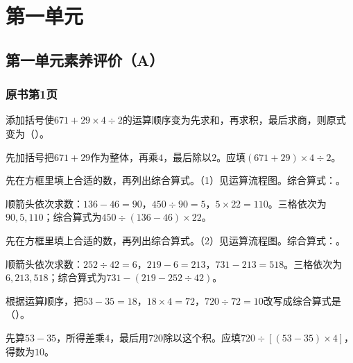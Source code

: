 \chapter{第一单元}


\section{第一单元素养评价（A）}



\subsection*{原书第1页}

添加括号使\(671+29\times4\div2\)的运算顺序变为先求和，再求积，最后求商，则原式变为（\hspace{1.8em}）。\par
\begin{BookAnswer}
先加括号把\(671+29\)作为整体，再乘\(4\)，最后除以\(2\)。应填\((671+29)\times4\div2\)。
\end{BookAnswer}

先在方框里填上合适的数，再列出综合算式。（1）见运算流程图。综合算式：\BookBlank{}。\par
{}
\begin{BookAnswer}
顺箭头依次求数：\(136-46=90\)，\allowbreak{}\(450\div90=5\)，\allowbreak{}\(5\times22=110\)。三格依次为\(90,5,110\)；综合算式为\(450\div(136-46)\times22\)。
\end{BookAnswer}

先在方框里填上合适的数，再列出综合算式。（2）见运算流程图。综合算式：\BookBlank{}。\par
{}
\begin{BookAnswer}
顺箭头依次求数：\(252\div42=6\)，\allowbreak{}\(219-6=213\)，\allowbreak{}\(731-213=518\)。三格依次为\(6,213,518\)；综合算式为\(731-(219-252\div42)\)。
\end{BookAnswer}

根据运算顺序，把\(53-35=18\)，\allowbreak{}\(18\times4=72\)，\allowbreak{}\(720\div72=10\)改写成综合算式是（\hspace{1.8em}）。\par
\begin{BookAnswer}
先算\(53-35\)，所得差乘\(4\)，最后用\(720\)除以这个积。应填\(720\div[(53-35)\times4]\)，得数为\(10\)。
\end{BookAnswer}

